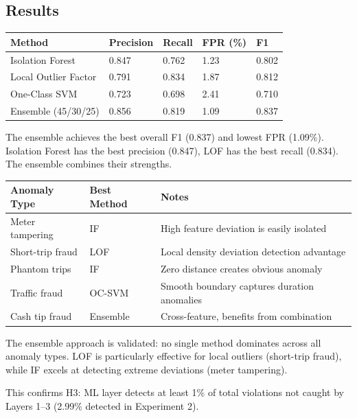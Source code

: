 \subsection{Results}

\begin{longtable}{|m{3cm}|R{2.5cm}|R{2.5cm}|R{2.5cm}|R{2.5cm}|}
\hline
\textbf{Method} & \textbf{Precision} & \textbf{Recall} & \textbf{FPR (\%)} & \textbf{F1} \\ \hline
Isolation Forest & 0.847 & 0.762 & 1.23 & 0.802 \\ \hline
Local Outlier Factor & 0.791 & 0.834 & 1.87 & 0.812 \\ \hline
One-Class SVM & 0.723 & 0.698 & 2.41 & 0.710 \\ \hline
Ensemble (45/30/25) & 0.856 & 0.819 & 1.09 & 0.837 \\ \hline
\end{longtable}

The ensemble achieves the best overall F1 (0.837) and lowest FPR (1.09\%). Isolation Forest has the best precision (0.847), LOF has the best recall (0.834). The ensemble combines their strengths.

\begin{longtable}{|m{4cm}|m{4cm}|m{4cm}|}
\hline
\textbf{Anomaly Type} & \textbf{Best Method} & \textbf{Notes} \\ \hline
Meter tampering & IF & High feature deviation is easily isolated \\ \hline
Short-trip fraud & LOF & Local density deviation detection advantage \\ \hline
Phantom trips & IF & Zero distance creates obvious anomaly \\ \hline
Traffic fraud & OC-SVM & Smooth boundary captures duration anomalies \\ \hline
Cash tip fraud & Ensemble & Cross-feature, benefits from combination \\ \hline
\end{longtable}

The ensemble approach is validated: no single method dominates across all anomaly types. LOF is particularly effective for local outliers (short-trip fraud), while IF excels at detecting extreme deviations (meter tampering).

This confirms H3: ML layer detects at least 1\% of total violations not caught by Layers 1--3 (2.99\% detected in Experiment 2).

